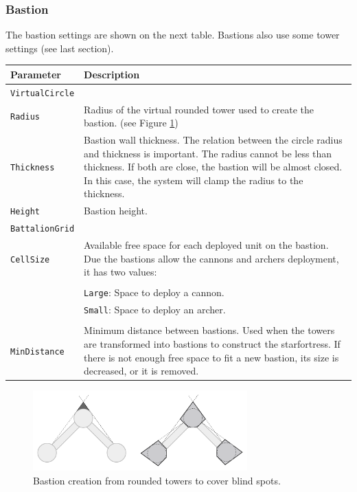 \documentclass[tog]{acmsiggraph}
\begin{document}
\subsubsection{Bastion}
\label{sec:settingscastlebastion}
 
The bastion settings are shown on the next table.
Bastions also use some tower settings (see last section).

\begin{tabularx}{0.48\textwidth}{ |l|X| }
\hline 
\textbf{Parameter} & \textbf{Description} \\[0.15cm]
 \hline
 \texttt{VirtualCircle} & \\
 \texttt{Radius} & Radius of the virtual rounded tower used to create the bastion. (see Figure \ref{fig:bastion}) \\
 \hline
 \texttt{Thickness} & Bastion wall thickness. The relation between the circle radius and thickness is important. The radius cannot be less than thickness. If both are close, the bastion will be almost closed. In this case, the system will clamp the radius to the thickness. \\
 \hline
 \texttt{Height} & Bastion height. \\
 \hline
 \texttt{BattalionGrid} & \\
 \texttt{CellSize} &  Available free space for each deployed unit on the bastion. Due the bastions allow the cannons and archers deployment, it has two values: \\
 & \\
 & \quad\texttt{Large}: Space to deploy a cannon. \\
 & \quad\texttt{Small}: Space to deploy an archer. \\
 & \\
 \hline
 \texttt{MinDistance} & Minimum distance between bastions. Used when the towers are transformed into bastions to construct the starfortress. If there is not enough free space to fit a new bastion, its size is decreased, or it is removed. \\
 \hline
\end{tabularx} 



\begin{figure}[h]
  \centering
  \includegraphics[width=3.25in]{figs/bastion}
  \caption{Bastion creation from rounded towers to cover blind spots. }
  \label{fig:bastion}
\end{figure}
\end{document}
